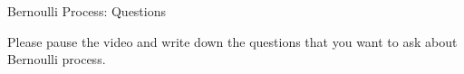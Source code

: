 \begin{frame}{Bernoulli Process: Questions}

\vspace{1cm}

{\Large Please pause the video and write down the questions that you
  want to ask about Bernoulli process. \hfill {}}

\bce[\bf Q1.]
\item
\item
\item
\item
\item
\ece

\end{frame}

\begin{comment}
\begin{frame}{Bernoulli Process as a Random Process}

\plitemsep 0.03in
\bci

\item<1-> \redf{Question.} We've already studied a sequence of Bernoulli rvs $X_1, X_2, \ldots, X_n.$ What's the difference?

\item<2-> \bluef{Physical difference:} \redf{infinite} sequence of $X_1, X_2, \ldots, .$
\bci
\item<3-> Sample space? set of all outcomes?
\item<4-> an outcome: an infinite sequence of sample values $x_1, x_2, \ldots,$ e.g., (0,1,1,0,0,1, \ldots)
\eci

\item<5-> \bluef{Semantic difference:} Understand $i$ in $X_i$ as time. Also, interesting questions from the random process point of view.
\bci
\item<6-> Dependence: How $X_1, X_2, \ldots$ are related to each other as a time series
\item<7-> Long-term behavior: What is the fraction of times that a machine is idle?
\item<8-> Other interesting questions, depending on the target random process
\eci

\item<9-> Next: Key questions and answers about Bernoulli process
\eci

\end{frame}

\end{comment}


